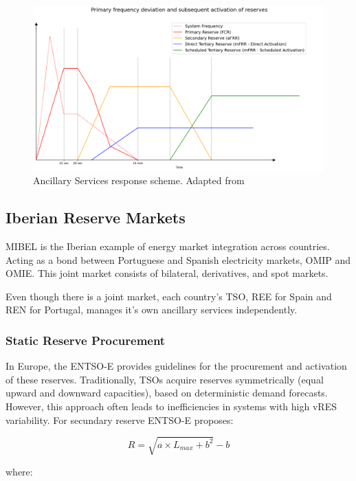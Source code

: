 \begin{figure}[H]
  \centering
  \includegraphics[width=\textwidth]{plots/actiavtion_example_eng.png}
  \caption{Ancillary Services response scheme. Adapted from \cite{handbook2009policy}}
  \label{fig:Ancillary_Services_response_scheme}
\end{figure}
\unskip



\subsection{Iberian Reserve Markets}

\gls{MIBEL} is the Iberian example of energy market integration across countries. Acting as a bond between Portuguese and Spanish electricity markets, \gls{OMIP} and \gls{OMIE}. This joint market consists of bilateral, derivatives, and spot markets.\par
Even though there is a joint market, each country's \gls{TSO}, \gls{REE} for Spain and \gls{REN} for Portugal, manages it's own ancillary services independently. 

\subsubsection{Static Reserve Procurement}
In Europe, the \gls{ENTSO-E} provides guidelines for the procurement and activation of these reserves. Traditionally, \gls{TSO}s acquire reserves symmetrically (equal upward and downward capacities), based on deterministic demand forecasts. However, this approach often leads to inefficiencies in systems with high \gls{vRES} variability.
%
For secundary reserve \gls{ENTSO-E} proposes:
\begin{linenomath}
\begin{equation}\label{eq:BRENTSOE} 
    R = \sqrt{a \times  L_{max} + b^{2}} - b 
\end{equation}
\end{linenomath}
where:

